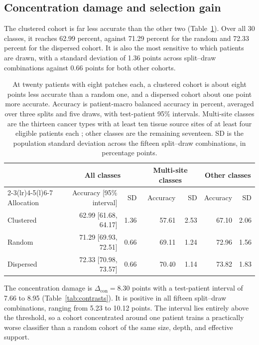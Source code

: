 \subsection{Concentration damage and selection gain}
\label{sec:contrast-results}
The clustered cohort is far less accurate than the other two (Table~\ref{tab:allocation-accuracy}). Over all 30 classes, it reaches 62.99 percent, against 71.29 percent for the random and 72.33 percent for the dispersed cohort. It is also the most sensitive to which patients are drawn, with a standard deviation of 1.36 points across split--draw combinations against 0.66 points for both other cohorts.

\begin{table}[htbp]
\centering
\small
\renewcommand{\arraystretch}{1.15}
\begin{tabular}{@{}lrrrrrr@{}}
\toprule
 & \multicolumn{2}{c}{All classes} & \multicolumn{2}{c}{Multi-site classes} & \multicolumn{2}{c}{Other classes} \\
\cmidrule(lr){2-3}\cmidrule(lr){4-5}\cmidrule(l){6-7}
Allocation & Accuracy [95\% interval] & SD & Accuracy & SD & Accuracy & SD \\
\midrule
Clustered & 62.99 [61.68, 64.17] & 1.36 & 57.61 & 2.53 & 67.10 & 2.06 \\
Random & 71.29 [69.93, 72.51] & 0.66 & 69.11 & 1.24 & 72.96 & 1.56 \\
Dispersed & 72.33 [70.98, 73.57] & 0.66 & 70.40 & 1.14 & 73.82 & 1.83 \\
\bottomrule
\end{tabular}
\caption{At twenty patients with eight patches each, a clustered cohort is about eight points less accurate than a random one, and a dispersed cohort about one point more accurate. Accuracy is patient-macro balanced accuracy in percent, averaged over three splits and five draws, with test-patient 95\% intervals. Multi-site classes are the thirteen cancer types with at least ten tissue source sites of at least four eligible patients each \citep{queisler2026siteCoverage}; other classes are the remaining seventeen. SD is the population standard deviation across the fifteen split--draw combinations, in percentage points.}
\label{tab:allocation-accuracy}
\end{table}

\noindent The concentration damage is $\Delta_{\mathrm{con}}=8.30$ points with a test-patient interval of 7.66 to 8.95 (Table~\ref{tab:contrasts}). It is positive in all fifteen split--draw combinations, ranging from 5.23 to 10.12 points. The interval lies entirely above the threshold, so a cohort concentrated around one patient trains a practically worse classifier than a random cohort of the same size, depth, and effective support.

